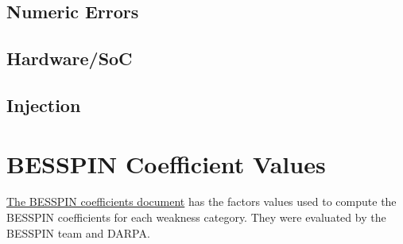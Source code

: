 \documentclass{article}
\begin{document}
\subsection{Numeric Errors}

\subsection{Hardware/SoC}

\subsection{Injection}
      
\section{BESSPIN Coefficient Values}
\href{https://github.com/DARPA-SSITH-Demonstrators/SSITH-FETT-Target/blob/develop/fett/docs/BESSPIN-Coeffs.md}{The BESSPIN coefficients document} has the factors values used to compute the BESSPIN coefficients for each weakness category. They were evaluated by the BESSPIN team and DARPA. 
\end{document}
